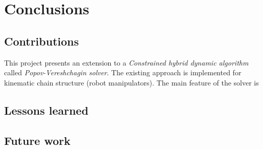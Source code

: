 
\chapter{Conclusions}

\section{Contributions}
This project presents an extension to a \textit{Constrained hybrid dynamic algorithm} called \textit{Popov-Vereshchagin solver}. The existing approach is implemented for kinematic chain structure (robot manipulators). The main feature of the solver is



\section{Lessons learned}


\section{Future work}
